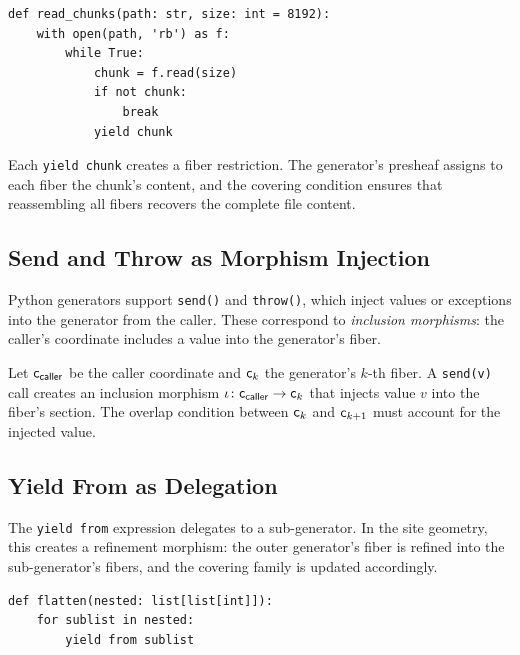\documentclass[11pt]{article}
\begin{document}
\begin{lstlisting}[style=jugeo-python,caption={Generator for reading large files.}]
def read_chunks(path: str, size: int = 8192):
    with open(path, 'rb') as f:
        while True:
            chunk = f.read(size)
            if not chunk:
                break
            yield chunk
\end{lstlisting}

Each \texttt{yield chunk} creates a fiber restriction.  The
generator's presheaf assigns to each fiber the chunk's content,
and the covering condition ensures that reassembling all fibers
recovers the complete file content.

\subsection{Send and Throw as Morphism Injection}

Python generators support \texttt{send()} and \texttt{throw()},
which inject values or exceptions into the generator from the caller.
These correspond to \emph{inclusion morphisms}: the caller's coordinate
includes a value into the generator's fiber.

\begin{proposition}\label{prop:send}
Let $\mathsf{c}_{\mathsf{caller}}$ be the caller coordinate and
$\mathsf{c}_k$ the generator's $k$-th fiber.  A \texttt{send(v)} call
creates an inclusion morphism
$\iota \colon \mathsf{c}_{\mathsf{caller}} \to \mathsf{c}_k$ that injects
value $v$ into the fiber's section.  The overlap condition between
$\mathsf{c}_k$ and $\mathsf{c}_{k+1}$ must account for the injected value.
\end{proposition}

\subsection{Yield From as Delegation}

The \texttt{yield from} expression delegates to a sub-generator.
In the site geometry, this creates a refinement morphism: the outer
generator's fiber is refined into the sub-generator's fibers, and
the covering family is updated accordingly.

\begin{lstlisting}[style=jugeo-python,caption={Generator delegation.}]
def flatten(nested: list[list[int]]):
    for sublist in nested:
        yield from sublist
\end{lstlisting}
\end{document}
